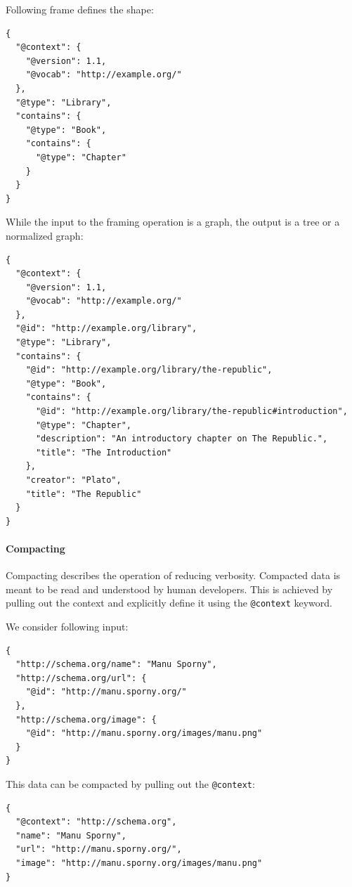 Following frame defines the shape:

\lstset{language=JSON}
\begin{lstlisting}[caption=Frame for the framing operation. \citep{jsonldbasicconcepts}]
{
  "@context": {
    "@version": 1.1,
    "@vocab": "http://example.org/"
  },
  "@type": "Library",
  "contains": {
    "@type": "Book",
    "contains": {
      "@type": "Chapter"
    }
  }
}
\end{lstlisting}

While the input to the framing operation is a graph, the output is a tree or a normalized graph:

\lstset{language=JSON}
\begin{lstlisting}[caption=Framed data of a library. \citep{jsonldbasicconcepts}]
{
  "@context": {
    "@version": 1.1,
    "@vocab": "http://example.org/"
  },
  "@id": "http://example.org/library",
  "@type": "Library",
  "contains": {
    "@id": "http://example.org/library/the-republic",
    "@type": "Book",
    "contains": {
      "@id": "http://example.org/library/the-republic#introduction",
      "@type": "Chapter",
      "description": "An introductory chapter on The Republic.",
      "title": "The Introduction"
    },
    "creator": "Plato",
    "title": "The Republic"
  }
}
\end{lstlisting}

\paragraph{Compacting}\label{jsonldcompacting}
Compacting describes the operation of reducing verbosity. Compacted data is meant to be read and understood by human developers. This is achieved by pulling out the context and explicitly define it using the \lstinline{@context} keyword.

We consider following input:

\lstset{language=JSON}
\begin{lstlisting}[caption=Verbose data of a person. \citep{jsonldbasicconcepts}]
{
  "http://schema.org/name": "Manu Sporny",
  "http://schema.org/url": {
    "@id": "http://manu.sporny.org/"
  },
  "http://schema.org/image": {
    "@id": "http://manu.sporny.org/images/manu.png"
  }
}
\end{lstlisting}

This data can be compacted by pulling out the \lstinline{@context}:

\lstset{language=JSON}
\begin{lstlisting}[caption=Compacted and easy-to-read data of a person. \citep{jsonldbasicconcepts}]
{
  "@context": "http://schema.org",
  "name": "Manu Sporny",
  "url": "http://manu.sporny.org/",
  "image": "http://manu.sporny.org/images/manu.png"
}
\end{lstlisting}

